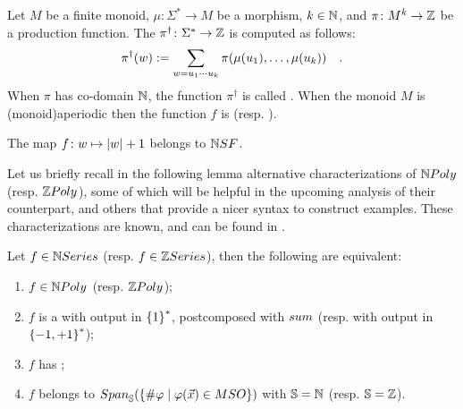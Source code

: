 \begin{definition}
    \label{nat-rel-poly:def}
    Let $M$ be a finite monoid, $\mu \colon \Sigma^* \to M$
    be a morphism, $k \in \mathbb{N}$, and 
    $\pi \colon M^k \to \mathbb{Z}$ be a production function.
    The 
    $\pi^\dagger \colon \Sigma^* \to \mathbb{Z}$
    is computed as follows:
    \begin{equation*}
        \pi^\dagger (w) \mathrel{:=}
        \sum_{w = u_1 \cdots u_k} \pi(\mu(u_1), \dots, \mu(u_k))
        \quad .
    \end{equation*}
    When $\pi$ has co-domain $\mathbb{N}$, the function $\pi^\dagger$
    is called .
    When the monoid $M$ is \kl(monoid){aperiodic}
    then
    the function $f$ is 
    (resp. ).
\end{definition}


\begin{example}
    \label{size-of-word-nsf:ex}
    The map $f \colon w \mapsto \card{w} + 1$
    belongs to $\NSF$.
\end{example}


\AP Let us briefly recall in the following lemma alternative characterizations
of $\NPoly$ (resp. $\ZPoly$), some of which will be helpful in the upcoming
analysis of their  counterpart, and others that provide
a nicer syntax to construct examples. These characterizations are known, and
can be found in \cite{gaetanphd,LOPEZ23b}.

\begin{lemma}
    \label{polynomial-rational-polyreg:fact}
    Let $f \in \NRat$ (resp. $f \in \ZRat$), then
    the following are equivalent:
    \begin{enumerate}
        \item $f \in \NPoly$ (resp. $\ZPoly$);
        \item $f$ is a  with output
            in $\mathopen{\{} 1 \mathclose{\}}^*$,
            postcomposed with $\polysum$
            (resp. with output in $\mathopen{\{} -1,+1 \mathclose{\}}^*$);
        \item $f$ has ;
        \item \label{npoly-counting-mso:item} $f$ belongs to
            $\Span{\mathbb{S}}(\setof{\vcount{\varphi}}{\varphi(\vec{x}) \in \MSO})$
            with $\mathbb{S} = \mathbb{N}$
            (resp. $\mathbb{S} = \mathbb{Z}$).
    \end{enumerate}
\end{lemma}

